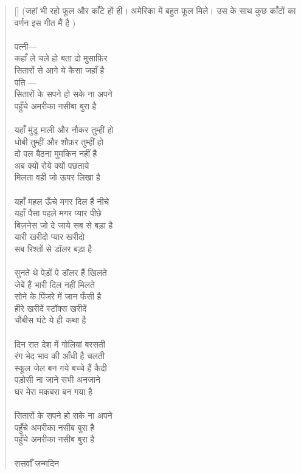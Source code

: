 \begin{verse}[\versewidth]\texthindi{
(जहां भी रहो फूल और काँटे हों ही। अमेरिका में बहुत फूल मिले। उस के साथ कुछ काँटों का वर्णन इस गीत मैं है
)\\
\\
पत्नी—\\
कहाँ ले चले हो बता दो मुसाफ़िर\\
सितारों से आगे ये कैसा जहाँ है\\
पति —\\
सितारों के सपने हो सके ना अपने\\
पहुँचे अमरीका नसीबा बुरा है\\
\\
यहाँ मुंडू माली और नौकर तुम्हीं हो\\
धोबी तुम्हीं और शौफ़र तुम्हीं हो\\
दो पल बैठना मुमकिन नहीं है\\
अब क्यों रोये क्यों पछताये\\
मिलता वही जो ऊपर लिखा है\\
\\
यहाँ महल ऊँचे मगर दिल हैं नीचे\\
यहाँ पैसा पहले मगर प्यार पीछे\\
बिज़नेस जो दे जाये सब से बड़ा है\\
यारी खरीदो प्यार खरीदो\\
सब रिश्तों से डॉलर बड़ा है\\
\\
सुनते थे पेड़ों पे डॉलर हैं खिलते\\
जेबें हैं भारी दिल नहीं मिलते\\
सोने के पिंजरे में जान फँसी है\\
हीरे खरीदें स्टॉक्स खरीदें\\
चौबीस घंटे ये ही कथा है\\
\\
दिन रात देश में गोलियां बरसती\\
रंग भेद भाव की आँधी है चलती\\
स्कूल जेल बन गये बच्चे हैं कैदी\\
पड़ोसी ना जाने सभी अनजाने\\
घर मेरा मकबरा बन गया है\\
\\
सितारों के सपने हो सके ना अपने\\
पहुँचे अमरीका नसीब बुरा है\\
पहुँचे अमरीका नसीब बुरा है\\
\\
सत्तर्वाँ जन्मदिन\\
}
\end{verse}
